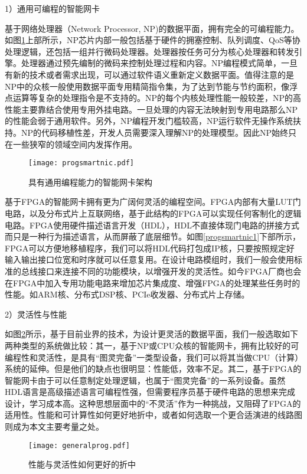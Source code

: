 1）通用可编程的智能网卡

基于网络处理器（Network Processor, NP)的数据平面，拥有完全的可编程能力。如图\ref{fig:progsmartnic1}上部所示，NP芯片内部一般包括基于硬件的拥塞控制、队列调度、QoS等协处理逻辑，还包括一组并行微码处理器。处理器按任务可分为核心处理器和转发引擎。处理器通过预先编制的微码来控制处理过程和内容。NP编程模式简单，一旦有新的技术或者需求出现，可以通过软件语义重新定义数据平面。值得注意的是NP中的众核一般使用数据平面专用精简指令集，为了达到节能与节约面积，像浮点运算等复杂的处理指令是不支持的。NP的每个内核处理性能一般较差，NP的高性能主要靠结合使用专用外挂电路。一旦处理的内容无法映射到专用电路那么NP的性能会弱于通用软件。另外，NP编程开发门槛较高，NP运行软件无操作系统扶持。NP的代码移植性差，开发人员需要深入理解NP的处理模型。因此NP始终只在一些狭窄的领域空间内发挥作用。

\begin{figure}[!ht]
	\centering
	\texttt{[image: progsmartnic.pdf]}
	\caption{具有通用编程能力的智能网卡架构} \label{fig:progsmartnic1}
\end{figure}

基于FPGA的智能网卡拥有更为广阔何灵活的编程空间。FPGA内部有大量LUT门电路，以及分布式片上互联网络，基于此结构的FPGA可以实现任何客制化的逻辑电路。FPGA使用硬件描述语言开发（HDL），HDL不直接体现门电路的拼接方式而只是一种行为描述语言，从而屏蔽了底层细节。如图\ref{progsmartnic1}下部所示，FPGA可以方便地移植程序，我们可以将HDL代码打包成IP核，只要按照规定好输入输出接口位宽和时序就可以任意复用。在设计电路模组时，我们一般会使用标准的总线接口来连接不同的功能模块，以增强开发的灵活性。如今FPGA厂商也会在FPGA中加入专用功能电路来增加芯片集成度、增强FPGA的处理某些任务时的性能。如ARM核、分布式DSP核、PCIe收发器、分布式片上存储。

2）灵活性与性能

如图\ref{fig:generalprog}所示，基于目前业界的技术，为设计更灵活的数据平面，我们一般选取如下两种类型的系统做比较：其一，基于NP或CPU众核的智能网卡，拥有比较好的可编程性和灵活性，是具有“图灵完备”一类型设备，我们可以将其当做CPU（计算）系统的延伸。但是他们的缺点也很明显：性能低，效率不足。其二，基于FPGA的智能网卡由于可以任意制定处理逻辑，也属于“图灵完备”的一系列设备。虽然HDL语言是高级描述语言可编程性强，但需要程序员基于硬件电路的思想来完成设计，学习成本高。这种思想层面中的“不灵活”作为一种挑战，又阻碍了FPGA的适用性。性能和可计算性如何更好地折中，或者如何选取一个更合适演进的线路图则成为本文主要考量之处。

\begin{figure}[!ht]
	\centering
	\texttt{[image: generalprog.pdf]}
	\caption{性能与灵活性如何更好的折中} \label{fig:generalprog}
\end{figure}





